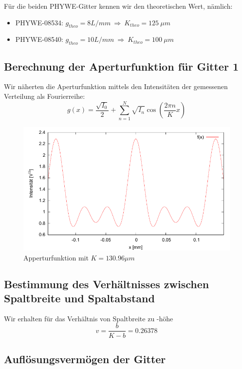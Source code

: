 F\"ur die beiden PHYWE-Gitter kennen wir den theoretischen Wert, n\"amlich: 
\begin{itemize}
\item PHYWE-08534: $g_{theo} = 8 L/mm\ \Rightarrow \ K_{theo} = 125 \ \mu m$
\item PHYWE-08540: $g_{theo} = 10 L/mm\ \Rightarrow \ K_{theo} = 100 \ \mu m$
\end{itemize} 

\subsection{Berechnung der Aperturfunktion f\"ur Gitter 1}

Wir näherten die Aperturfunktion mittels den Intensit\"aten der gemessenen Verteilung als Fourierreihe:
$$g(x) = \frac{\sqrt{I_0}}{2} + \sum_{n=1}^N \sqrt{I_n}\cos\left(\frac{2\pi n}{K}x \right)$$

\begin{figure}[H]
 \includegraphics{Bilder/appertur.pdf}
\caption{Apperturfunktion mit $K = 130.96 \mu m $}
\end{figure}


\subsection{Bestimmung des Verh\"altnisses zwischen Spaltbreite und Spaltabstand}

Wir erhalten für das Verhältnis von Spaltbreite zu -höhe
$$ v = \frac{b}{K-b} = 0.26378 $$ %

\subsection{Aufl\"osungsverm\"ogen der Gitter}

